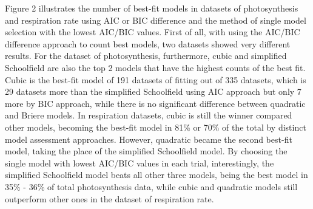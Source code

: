 Figure 2 illustrates the number of best-fit models in datasets of photosynthesis and respiration rate using AIC or BIC difference and the method of single model selection with the lowest AIC/BIC values. First of all, with using the AIC/BIC difference approach to count best models, two datasets showed very different results. For the dataset of photosynthesis, furthermore, cubic and simplified Schoolfield are also the top 2 models that have the highest counts of the best fit. Cubic is the best-fit model of 191 datasets of fitting out of 335 datasets, which is 29 datasets more than the simplified Schoolfield using AIC approach but only 7 more by BIC approach, while there is no significant difference between quadratic and Briere models. In respiration datasets, cubic is still the winner compared other models, becoming the best-fit model in 81\% or 70\% of the total by distinct model assessment approaches. However, quadratic became the second best-fit model, taking the place of the simplified Schoolfield model. By choosing the single model with lowest AIC/BIC values in each trial, interestingly, the simplified Schoolfield model beats all other three models, being the best model in 35\% - 36\% of total photosynthesis data, while cubic and quadratic models still outperform other ones in the dataset of respiration rate.
